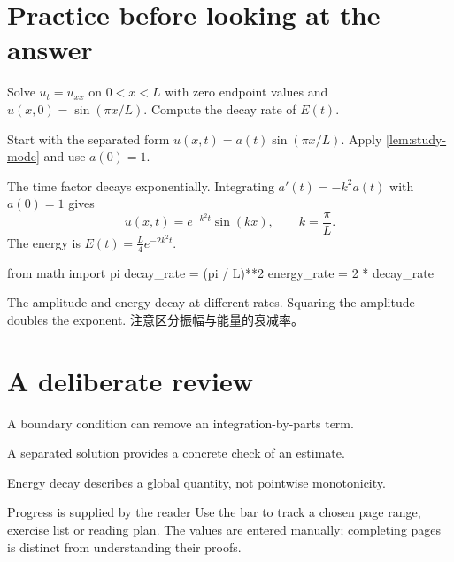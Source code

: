\expandafter\documentclass\expandafter[\StudyOptions]{lumenbook}
\begin{document}
\section{Practice before looking at the answer}
\begin{exercise}\label{ex:study-mode}
Solve $u_t=u_{xx}$ on $0<x<L$ with zero endpoint values and
$u(x,0)=\sin(\pi x/L)$. Compute the decay rate of $E(t)$.
\end{exercise}
\begin{hint}
Start with the separated form $u(x,t)=a(t)\sin(\pi x/L)$.
Apply \cref{lem:study-mode} and use $a(0)=1$.
\end{hint}
\begin{solution}
The time factor decays exponentially. Integrating
$a'(t)=-k^2a(t)$ with $a(0)=1$ gives
\begin{equation}\label{eq:study-answer}
  u(x,t)=e^{-k^2t}\sin(kx),\qquad k=\frac{\pi}{L}.
\end{equation}
The energy is $E(t)=\frac{L}{4}e^{-2k^2t}$.
\begin{codeblock}[language=Python,title={Decay rate}]
from math import pi
decay_rate = (pi / L)**2
energy_rate = 2 * decay_rate
\end{codeblock}
\end{solution}
\begin{pitfall}
The amplitude and energy decay at different rates. Squaring the
amplitude doubles the exponent. 注意区分振幅与能量的衰减率。
\end{pitfall}

\newpage
\section{A deliberate review}
\begin{chaptersummary}
  \item A boundary condition can remove an integration-by-parts term.
  \item A separated solution provides a concrete check of an estimate.
  \item Energy decay describes a global quantity, not pointwise monotonicity.
\end{chaptersummary}
\begin{reviewchecklist}
\end{reviewchecklist}
\begin{readingbox}{Progress is supplied by the reader}
Use the bar to track a chosen page range, exercise list or reading plan.
The values are entered manually; completing pages is distinct from
understanding their proofs.
\end{readingbox}
\end{document}
